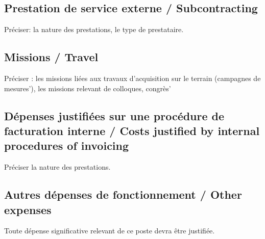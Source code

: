 \subsection{Prestation de service externe / Subcontracting}
\begin{xcomment}  
Pr\'eciser:
la nature des prestations,
le type de prestataire.

\end{xcomment}

\subsection{Missions / Travel}
\begin{xcomment} 
Pr\'eciser :
les missions li\'ees aux travaux d'acquisition sur le terrain (campagnes de mesures'),
les missions relevant de colloques, congr\`es'
\end{xcomment}

\subsection{D\'epenses justifi\'ees sur une proc\'edure de facturation interne / Costs justified by internal procedures of invoicing}
\begin{xcomment}  
Pr\'eciser la nature des prestations.
\end{xcomment}


\subsection{Autres d\'epenses de fonctionnement / Other expenses}
\begin{xcomment}
Toute d\'epense significative relevant de ce poste devra être justifi\'ee.
\end{xcomment}



\endinput